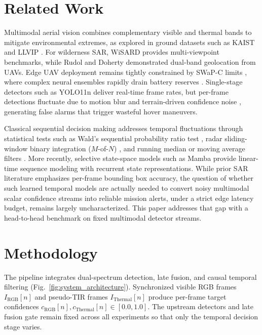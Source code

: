 \documentclass[conference]{IEEEtran}
\begin{document}
\section{Related Work}

Multimodal aerial vision combines complementary visible and thermal bands to mitigate environmental extremes, as explored in ground datasets such as KAIST \cite{hwang2015multispectral} and LLVIP \cite{jia2021llvip}. For wilderness SAR, WiSARD \cite{broyles2022wisard} provides multi-viewpoint benchmarks, while Rudol and Doherty \cite{rudol2008human} demonstrated dual-band geolocation from UAVs. Edge UAV deployment remains tightly constrained by SWaP-C limits \cite{silvagni2017multipurpose}, where complex neural ensembles rapidly drain battery reserves \cite{lygouras2019unsupervised}. Single-stage detectors such as YOLO11n \cite{jocher2024yolo11} deliver real-time frame rates, but per-frame detections fluctuate due to motion blur and terrain-driven confidence noise \cite{portmann2014people}, generating false alarms that trigger wasteful hover maneuvers.

Classical sequential decision making addresses temporal fluctuations through statistical tests such as Wald's sequential probability ratio test \cite{wald1945sequential}, radar sliding-window binary integration ($M$-of-$N$) \cite{richards2014fundamentals}, and running median or moving average filters \cite{rabiner1975applications}. More recently, selective state-space models such as Mamba \cite{gu2023mamba} provide linear-time sequence modeling with recurrent state representations. While prior SAR literature emphasizes per-frame bounding box accuracy, the question of whether such learned temporal models are actually needed to convert noisy multimodal scalar confidence streams into reliable mission alerts, under a strict edge latency budget, remains largely uncharacterized. This paper addresses that gap with a head-to-head benchmark on fixed multimodal detector streams.

\section{Methodology}

The pipeline integrates dual-spectrum detection, late fusion, and causal temporal filtering (Fig.~\ref{fig:system_architecture}). Synchronized visible RGB frames $I_{\text{RGB}}[n]$ and pseudo-TIR frames $I_{\text{Thermal}}[n]$ produce per-frame target confidences $c_{\text{RGB}}[n], c_{\text{Thermal}}[n] \in [0.0, 1.0]$. The upstream detectors and late fusion gate remain fixed across all experiments so that only the temporal decision stage varies.
\end{document}
